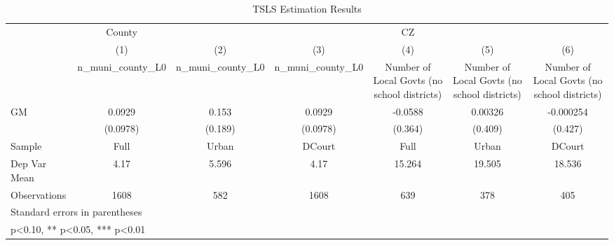 \begin{table}[htbp]\centering
\def\sym#1{\ifmmode^{#1}\else\(^{#1}\)\fi}
\caption{TSLS Estimation Results}
\begin{tabular}{l*{6}{c}}
\toprule
                    &      County   &               &               &          CZ   &               &               \\
                    &\multicolumn{1}{c}{(1)}&\multicolumn{1}{c}{(2)}&\multicolumn{1}{c}{(3)}&\multicolumn{1}{c}{(4)}&\multicolumn{1}{c}{(5)}&\multicolumn{1}{c}{(6)}\\
                    &\multicolumn{1}{c}{n\_muni\_county\_L0}&\multicolumn{1}{c}{n\_muni\_county\_L0}&\multicolumn{1}{c}{n\_muni\_county\_L0}&\multicolumn{1}{c}{Number of Local Govts (no school districts)}&\multicolumn{1}{c}{Number of Local Govts (no school districts)}&\multicolumn{1}{c}{Number of Local Govts (no school districts)}\\
\midrule
GM                  &      0.0929   &       0.153   &      0.0929   &     -0.0588   &     0.00326   &   -0.000254   \\
                    &    (0.0978)   &     (0.189)   &    (0.0978)   &     (0.364)   &     (0.409)   &     (0.427)   \\
\midrule
Sample              &        Full   &       Urban   &      DCourt   &        Full   &       Urban   &      DCourt   \\
Dep Var Mean        &        4.17   &       5.596   &        4.17   &      15.264   &      19.505   &      18.536   \\
Observations        &        1608   &         582   &        1608   &         639   &         378   &         405   \\
\bottomrule
\multicolumn{7}{l}{\footnotesize Standard errors in parentheses}\\
\multicolumn{7}{l}{\footnotesize * p<0.10, ** p<0.05, *** p<0.01}\\
\end{tabular}
\end{table}
